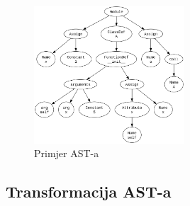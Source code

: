 \begin{figure}[hb]
    \label{fig:ast-example}
    \centering
    \includegraphics[width=0.5\textwidth]{assets/ast-example.png}
    \caption{Primjer AST-a}
\end{figure}

\subsection{Transformacija AST-a}
